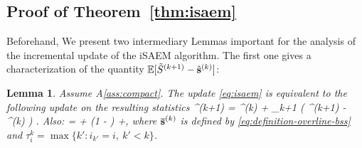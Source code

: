 \documentclass[11pt]{article}
\newtheorem*{Lemma*}{Lemma}
\theoremstyle{t}
\begin{document}

\subsection{Proof of Theorem~\ref{thm:isaem}}\label{app:theoremisaem}
Beforehand, We present two intermediary Lemmas important for the analysis of the incremental update of the iSAEM algorithm.
The first one gives a characterization of the quantity $\EE[\tilde{S}^{(k+1)} - \hat{\bss}^{(k)}]$:
\begin{Lemma*}
 Assume A\ref{ass:compact}. The update \eqref{eq:isaem} is equivalent to the following update on the resulting statistics 
\beq\notag
\hat{\bss}^{(k+1)} =  \hat{\bss}^{(k)}  + \gamma_{k+1} \big( ^{(k+1)} - \hat{\bss}^{(k)} \big) \eqsp.
\eeq 
Also:
\beq\notag
{} =  + \left(1 -  \right) \EE\left[\frac{1}{n} \sum_{i=1}^n \tilde{S}_i^{(\tau_i^k)}- \overline{\bss}^{(k)}\right]  +\EE[\eta_{i_k}^{(k+1)}]\eqsp ,
\eeq
where $\overline{\bss}^{(k)}$ is defined by \eqref{eq:definition-overline-bss} and $\tau_i^k = \max \{ k' : i_{k'} = i,~k' < k \}$.
\end{Lemma*}
\end{document}
